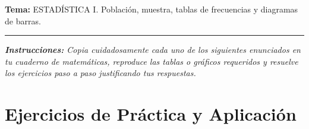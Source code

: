 \documentclass[12pt, letterpaper]{article}
\begin{document}
	\vspace{0.2cm}
	\noindent \textbf{Tema:} ESTADÍSTICA I. Población, muestra, tablas de frecuencias y diagramas de barras.
	\vspace{0.2cm}
	\hrule
	\vspace{0.4cm}
	
	\noindent \textit{\textbf{Instrucciones:} Copia cuidadosamente cada uno de los siguientes enunciados en tu cuaderno de matemáticas, reproduce las tablas o gráficos requeridos y resuelve los ejercicios paso a paso justificando tus respuestas.}
	\vspace{0.4cm}
	
	\section*{Ejercicios de Práctica y Aplicación}
	
\end{document}
